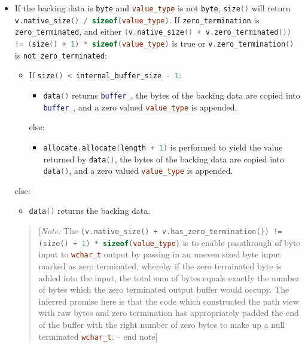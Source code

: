 \documentclass[11pt]{article}
\newcommand{\code}[2][cpp]{\lstinline[language=#1,basicstyle=\small\ttfamily]{#2}}
\newcommand{\note}[1]{\begin{quote}[\textit{Note:} #1 -- end note]\end{quote}}
\begin{document}
\begin{itemize}
    \item If the backing data is \code{byte} and \code{value_type} is not \code{byte}, \code{size()} will return \code{v.native_size() / sizeof(value_type)}. If \code{zero_termination} is \code{zero_terminated}, and either \code{(v.native_size() + v.zero_terminated()) != (size() + 1) * sizeof(value_type)} is true or \code{v.zero_termination()} is \code{not_zero_terminated}:
    \begin{itemize}
        \item If \code{size() < internal_buffer_size - 1}:
        \begin{itemize}
            \item \code{data()} returns \code{buffer_}, the bytes of the backing data are copied into \code{buffer_}, and a zero valued \code{value_type} is appended. 
        \end{itemize}
        else:
        \begin{itemize}
            \item \code{allocate.allocate(length + 1)} is performed to yield the value returned by \code{data()}, the bytes of the backing data are copied into \code{data()}, and a zero valued \code{value_type} is appended.
        \end{itemize}
    \end{itemize}
    else:
    \begin{itemize}
        \item \code{data()} returns the backing data.
    \end{itemize}

\color{black}

\note{The \code{(v.native_size() + v.has_zero_termination()) != (size() + 1) * sizeof(value_type)} is to enable passthrough of byte input to \code{wchar_t} output by passing in an uneven sized byte input marked as zero terminated, whereby if the zero terminated byte is added into the input, the total sum of bytes equals exactly the number of bytes which the zero terminated output buffer would occupy. The inferred promise here is that the code which constructed the path view with raw bytes and zero termination has appropriately padded the end of the buffer with the right number of zero bytes to make up a null terminated \code{wchar_t}.}

\color{darkgreen}


\end{itemize}
\end{document}
